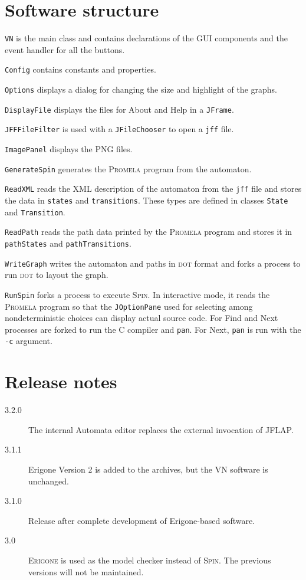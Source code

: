 \documentclass[11pt]{article}
\newcommand{\dt}{\textsc{dot}}
\newcommand{\spn}{\textsc{Spin}}
\newcommand{\prm}{\textsc{Promela}}
\newcommand{\erg}{\textsc{Erigone}}
\newcommand{\p}[1]{\texttt{#1}}
\newcommand{\bu}[1]{\textsf{#1}}
\begin{document}
\section{Software structure}
\p{VN} is the main class and contains declarations
of the GUI components and the event handler for all the buttons.

\p{Config} contains constants and properties.

\p{Options} displays a dialog for changing the size and highlight of the graphs.

\p{DisplayFile} displays the files for \bu{About} and \bu{Help}
in a \p{JFrame}.

\p{JFFFileFilter} is used with a \p{JFileChooser} to open a \p{jff} file.

\p{ImagePanel} displays the \textsc{PNG} files.

\p{GenerateSpin} generates the \prm{} program from the automaton.

\p{ReadXML} reads the XML description of the automaton from the \p{jff} file and
stores the data in \p{states} and \p{transitions}. These types are defined in
classes \p{State} and \p{Transition}.

\p{ReadPath} reads the path data printed by the \prm{} program and stores it in
\p{pathStates} and \p{pathTransitions}.

\p{WriteGraph} writes the automaton and paths in \dt{} format and forks a process to
run \dt{} to layout the graph.

\p{RunSpin} forks a process to execute \spn{}. In interactive mode, it reads the
\prm{} program so that the \p{JOptionPane} used for selecting among
nondeterministic choices can display actual source code. For \bu{Find} and
\bu{Next} processes are forked to run the C compiler and \p{pan}. 
For \bu{Next}, \p{pan} is run with the \p{-c} argument.

\appendix

\section{Release notes}

\begin{description}
\item[3.2.0] The internal Automata editor replaces the external invocation of JFLAP.
\item[3.1.1] Erigone Version 2 is added to the archives,
but the VN software is unchanged.
\item[3.1.0] Release after complete development of Erigone-based software. 
\item[3.0] \erg{} is used as the model checker instead of \spn{}.
The previous versions will not be maintained.
\end{description}
\end{document}
